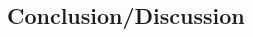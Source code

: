 \documentclass[11pt, A4paper, english]{article}
\begin{document}
	\begin{multicols}{2}
		\section{Conclusion/Discussion}


		\begin{thebibliography}{9}
		\end{thebibliography}
	\end{multicols}
\end{document}
